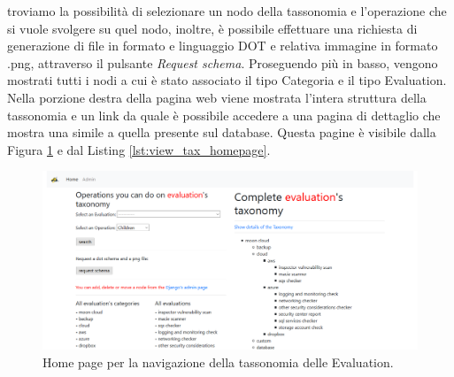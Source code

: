 troviamo la possibilità di selezionare un nodo della tassonomia e l'operazione che si vuole svolgere su quel nodo, inoltre, è possibile effettuare 
una richiesta di generazione di file in formato e linguaggio DOT e relativa immagine in formato .png, attraverso il pulsante \textit{Request schema}. 
Proseguendo più in basso, vengono mostrati tutti i nodi a cui è stato associato il tipo Categoria e il tipo Evaluation. Nella porzione destra della 
pagina web viene mostrata l'intera struttura della tassonomia e un link da quale è possibile accedere a una pagina di dettaglio che mostra una 
simile a quella presente sul database. Questa pagine è visibile dalla Figura \ref{fig:MCRS_taxindex} e dal Listing \ref{lst:view_tax_homepage}.\hfill\break
%
\begin{figure}[ht!]
    \includegraphics[scale=0.3]{images/MCRS_taxindex.png}
    \caption{Home page per la navigazione della tassonomia delle Evaluation.}
    \label{fig:MCRS_taxindex}
\end{figure}
%
\lstset{style=python_code_style}
